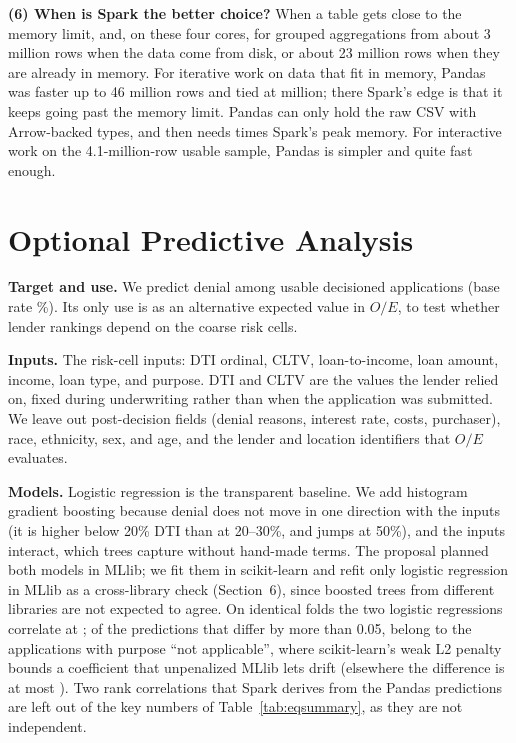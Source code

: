 \documentclass[acmtog,nonacm]{acmart}
\begin{document}
\textbf{(6) When is Spark the better choice?} When a table gets close to the memory limit, and, on these four cores, for grouped aggregations from about 3 million rows when the data come from disk, or about 23 million rows when they are already in memory. For iterative work on data that fit in memory, Pandas was faster up to 46 million rows and tied at \lastRows{} million; there Spark's edge is that it keeps going past the memory limit. Pandas can only hold the raw CSV with Arrow-backed types, and then needs \wzMemRatio{} times Spark's peak memory. For interactive work on the 4.1-million-row usable sample, Pandas is simpler and quite fast enough.

\section{Optional Predictive Analysis}\label{sec:pred}

\textbf{Target and use.} We predict denial among usable decisioned applications (base rate \baseRate\%). Its only use is as an alternative expected value in $O/E$, to test whether lender rankings depend on the coarse risk cells.

\textbf{Inputs.} The risk-cell inputs: DTI ordinal, CLTV, loan-to-income, loan amount, income, loan type, and purpose. DTI and CLTV are the values the lender relied on, fixed during underwriting rather than when the application was submitted. We leave out post-decision fields (denial reasons, interest rate, costs, purchaser), race, ethnicity, sex, and age, and the lender and location identifiers that $O/E$ evaluates.

\textbf{Models.} Logistic regression is the transparent baseline. We add histogram gradient boosting because denial does not move in one direction with the inputs (it is higher below 20\% DTI than at 20--30\%, and jumps at 50\%), and the inputs interact, which trees capture without hand-made terms. The proposal planned both models in MLlib; we fit them in scikit-learn and refit only logistic regression in MLlib as a cross-library check (Section~6), since boosted trees from different libraries are not expected to agree. On identical folds the two logistic regressions correlate at \corrMLlib; of the \nDiffMLlib{} predictions that differ by more than 0.05, \nDiffMLlibNA{} belong to the \nPurposeNA{} applications with purpose ``not applicable'', where scikit-learn's weak L2 penalty bounds a coefficient that unpenalized MLlib lets drift (elsewhere the difference is at most \maxDiffMLlibOther). Two rank correlations that Spark derives from the Pandas predictions are left out of the \nKeyNumbers{} key numbers of Table~\ref{tab:eqsummary}, as they are not independent.
\end{document}
